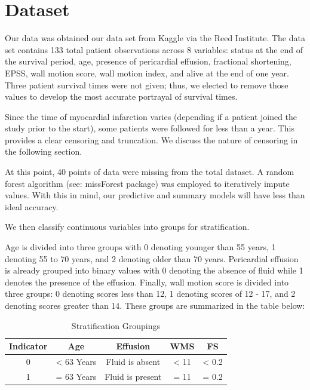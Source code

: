 \documentclass[
]{article}
\begin{document}
\hypertarget{dataset}{%
\section{Dataset}\label{dataset}}

Our data was obtained our data set from Kaggle via the Reed Institute.
The data set contains 133 total patient observations across 8 variables:
status at the end of the survival period, age, presence of pericardial
effusion, fractional shortening, EPSS, wall motion score, wall motion
index, and alive at the end of one year. Three patient survival times
were not given; thus, we elected to remove those values to develop the
most accurate portrayal of survival times.

Since the time of myocardial infarction varies (depending if a patient
joined the study prior to the start), some patients were followed for
less than a year. This provides a clear censoring and truncation. We
discuss the nature of censoring in the following section.

At this point, 40 points of data were missing from the total dataset. A
random forest algorithm (see: missForest package) was employed to
iteratively impute values. With this in mind, our predictive and summary
models will have less than ideal accuracy.

We then classify continuous variables into groups for stratification.

Age is divided into three groups with 0 denoting younger than 55 years,
1 denoting 55 to 70 years, and 2 denoting older than 70 years.
Pericardial effusion is already grouped into binary values with 0
denoting the absence of fluid while 1 denotes the presence of the
effusion. Finally, wall motion score is divided into three groups: 0
denoting scores less than 12, 1 denoting scores of 12 - 17, and 2
denoting scores greater than 14. These groups are summarized in the
table below:

\begin{table}[!h]

\caption{\label{tab:groupings.table}Stratification Groupings}
\centering
\begin{tabular}[t]{c|c|c|c|c}
\hline
Indicator & Age & Effusion & WMS & FS\\
\hline
0 & < 63 Years & Fluid is absent & < 11 & < 0.2\\
\hline
1 & = 63 Years & Fluid is present & = 11 & = 0.2\\
\hline
\end{tabular}
\end{table}
\end{document}
